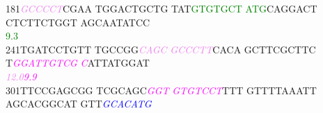 \documentclass[11pt,twoside,reqno,a4paper]{article}
\begin{document}
{181\hspace*{1\charwidth}\textit{\textcolor{violet}{G}}\textit{\textcolor{violet}{C}}\textit{\textcolor{violet}{C}}\textit{\textcolor{violet}{C}}\textit{\textcolor{violet}{C}}\textit{\textcolor{violet}{T}}CGAA	TGGACTGCTG	TAT\textcolor{green}{G}\textcolor{green}{T}\textcolor{green}{G}\textcolor{green}{T}\textcolor{green}{G}\textcolor{green}{C}\textcolor{green}{T}	\textcolor{green}{A}\textcolor{green}{T}\textcolor{green}{G}CAGGACT	CTCTTCTGGT	AGCAATATCC	\\
\hspace*{4\charwidth}\hspace*{1\charwidth}\hspace*{1\charwidth}\hspace*{23\charwidth}\textcolor{green}{9.3}\hspace*{1\charwidth}\hspace*{1\charwidth}\hspace*{1\charwidth}\hspace*{1\charwidth}\\
241\hspace*{1\charwidth}TGATCCTGTT	TGCCGG\textit{\textcolor{violet}{C}}\textit{\textcolor{violet}{A}}\textit{\textcolor{violet}{G}}\textit{\textcolor{violet}{C}}	\textit{\textcolor{violet}{G}}\textit{\textcolor{violet}{C}}\textit{\textcolor{violet}{C}}\textit{\textcolor{violet}{C}}\textit{\textcolor{violet}{T}}\textit{\textcolor{violet}{T}}CACA	GCTTCGCTTC	T\textit{\textcolor{magenta}{G}}\textit{\textcolor{magenta}{G}}\textit{\textcolor{magenta}{A}}\textit{\textcolor{magenta}{T}}\textit{\textcolor{magenta}{T}}\textit{\textcolor{magenta}{G}}\textit{\textcolor{magenta}{T}}\textit{\textcolor{magenta}{C}}\textit{\textcolor{magenta}{G}}	\textit{\textcolor{magenta}{C}}ATTATGGAT	\\
\hspace*{4\charwidth}\hspace*{1\charwidth}\hspace*{16\charwidth}\textit{\textcolor{violet}{12.0}}\hspace*{1\charwidth}\hspace*{1\charwidth}\hspace*{1\charwidth}\hspace*{21\charwidth}\textit{\textcolor{magenta}{9.9}}\hspace*{1\charwidth}\hspace*{1\charwidth}\\
301\hspace*{1\charwidth}TTCCGAGCGG	TCGCAGC\textit{\textcolor{magenta}{G}}\textit{\textcolor{magenta}{G}}\textit{\textcolor{magenta}{T}}	\textit{\textcolor{magenta}{G}}\textit{\textcolor{magenta}{T}}\textit{\textcolor{magenta}{G}}\textit{\textcolor{magenta}{T}}\textit{\textcolor{magenta}{C}}\textit{\textcolor{magenta}{C}}\textit{\textcolor{magenta}{T}}TTT	GTTTTAAATT	AGCACGGCAT	GTT\textit{\textcolor{blue}{G}}\textit{\textcolor{blue}{C}}\textit{\textcolor{blue}{A}}\textit{\textcolor{blue}{C}}\textit{\textcolor{blue}{A}}\textit{\textcolor{blue}{T}}\textit{\textcolor{blue}{G}}	\\
}
\end{document}
